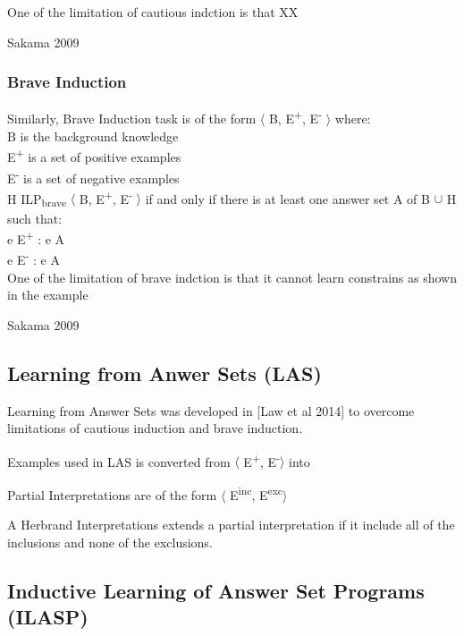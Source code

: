 \documentclass[12pt,twoside]{report}
\begin{document}
One of the limitation of cautious indction is that XX

Sakama 2009


\subsubsection{Brave Induction}

Similarly, Brave Induction task is of the form $\langle$ B, E\textsuperscript{+}, E\textsuperscript{-} $\rangle$ where: \\
B is the background knowledge \\
E\textsuperscript{+} is a set of positive examples \\
E\textsuperscript{-} is a set of negative examples \\

 H \in ILP\textsubscript{brave} $\langle$ B, E\textsuperscript{+}, E\textsuperscript{-} $\rangle$ if and only if there is at least one answer set A of B $\cup$ H such that: \\
\forall e \in E\textsuperscript{+} : e \in A \\
\forall e \in E\textsuperscript{-} : e \notin A \\

One of the limitation of brave indction is that it cannot learn constrains as shown in the example

Sakama 2009

\subsection{Learning from Anwer Sets (LAS)}

Learning from Answer Sets was developed in [Law et al 2014] to overcome limitations of cautious induction and brave induction.


Examples used in LAS is converted from $\langle$ E\textsuperscript{+}, E\textsuperscript{-}$\rangle$ into

Partial Interpretations are of the form $\langle$ E\textsuperscript{inc}, E\textsuperscript{exc}$\rangle$

A Herbrand Interpretations extends a partial interpretation if it include all of the inclusions and none of the exclusions.

\subsection{Inductive Learning of Answer Set Programs (ILASP)}
\end{document}
